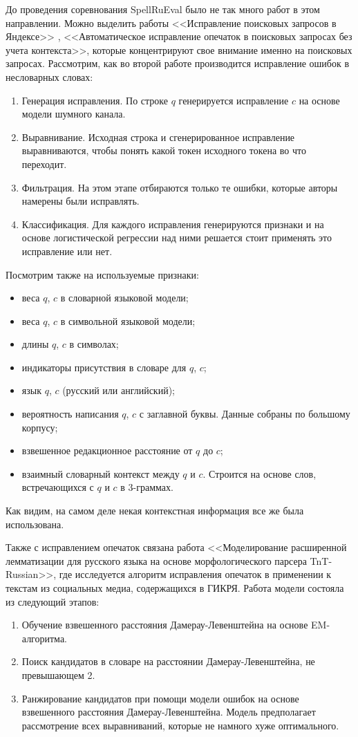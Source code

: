 До проведения соревнования SpellRuEval было не так много работ в этом направлении. Можно выделить работы <<Исправление поисковых запросов в Яндексе>> \cite{Bajtin2008}, <<Автоматическое исправление опечаток в поисковых запросах без учета контекста>>\cite{Panina2013}, которые концентрируют свое внимание именно на поисковых запросах. Рассмотрим, как во второй работе производится исправление ошибок в несловарных словах:
\begin{enumerate}
	\item Генерация исправления. По строке $q$ генерируется исправление $c$ на основе модели шумного канала.
	\item Выравнивание. Исходная строка и сгенерированное исправление выравниваются, чтобы понять какой токен исходного токена во что переходит.
	\item Фильтрация. На этом этапе отбираются только те ошибки, которые авторы намерены были исправлять.
	\item Классификация. Для каждого исправления генерируются признаки и на основе логистической регрессии над ними решается стоит применять это исправление или нет.
\end{enumerate}

Посмотрим также на используемые признаки:
\begin{itemize}
	\item веса $q$, $c$ в словарной языковой модели;
	\item веса $q$, $c$ в символьной языковой модели;
	\item длины $q$, $c$ в символах;
	\item индикаторы присутствия в словаре для $q$, $c$;
	\item язык $q$, $c$ (русский или английский);
	\item вероятность написания $q$, $c$ с заглавной буквы. Данные собраны по большому корпусу;
	\item взвешенное редакционное расстояние от $q$ до $c$;
	\item взаимный словарный контекст между $q$ и $c$. Строится на основе слов, встречающихся с $q$ и $c$ в 3-граммах.
\end{itemize}

Как видим, на самом деле некая контекстная информация все же была использована.

Также с исправлением опечаток связана работа <<Моделирование расширенной лемматизации для русского языка на основе морфологического парсера TnT-Russian>>\cite{Shavrina2015}, где исследуется алгоритм исправления опечаток в применении к текстам из социальных медиа, содержащихся в ГИКРЯ. Работа модели состояла из следующий этапов:
\begin{enumerate}
	\item Обучение взвешенного расстояния Дамерау-Левенштейна на основе EM-алгоритма.
	\item Поиск кандидатов в словаре на расстоянии Дамерау-Левенштейна, не превышающем 2.
	\item Ранжирование кандидатов при помощи модели ошибок на основе взвешенного расстояния Дамерау-Левенштейна. Модель предполагает рассмотрение всех выравниваний, которые не намного хуже оптимального.
\end{enumerate}

